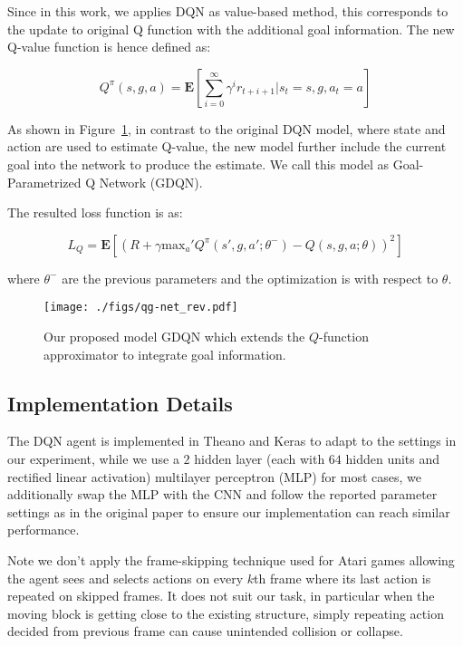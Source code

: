 \documentclass{article} %
\begin{document}
Since in this work, we applies DQN as value-based method, this corresponds to the update to original Q function with the additional goal information. The new Q-value function is hence defined as:

\begin{equation}
    Q^\pi(s,g,a) = \mathbf{E}[\sum\limits_{i=0}^\infty \gamma^i r_{t+i+1}|s_t=s,g,a_t=a]
\end{equation}

As shown in Figure~\ref{fig:goal_net}, in contrast to the original DQN model, where state and action are used to estimate Q-value,  the new model further include the current goal into the network to produce the estimate. We call this model as Goal-Parametrized Q Network (GDQN). 

The resulted loss function is as:

\begin{equation}
    L_Q = \mathbf{E}[(R + \gamma \text{max}_a' Q^\pi(s',g,a';\theta^-) - Q(s,g,a;\theta))^2 ]
\end{equation}

where $\theta^-$ are the previous parameters and the optimization is with respect to $\theta$. 

\begin{figure}[h]
\centering
\texttt{[image: ./figs/qg-net\_rev.pdf]}
\caption{Our proposed model GDQN which extends the $Q$-function approximator to integrate goal information.}
\label{fig:goal_net}
\end{figure}\subsection{Implementation Details}
The DQN agent is implemented in Theano and Keras to adapt to the settings in our experiment, while we use a $2$ hidden layer (each with $64$ hidden units and rectified linear activation) multilayer perceptron (MLP) for most cases, we additionally swap the MLP with the CNN and follow the reported parameter settings as in the original paper \citep{mnih2015human} to ensure our implementation can reach similar performance.

Note we don't apply the frame-skipping technique \citep{bellemare2012investigating} used for Atari games \citep{mnih2015human} allowing the agent sees and selects actions on every $k$th frame where its last action is repeated on skipped frames. It does not suit our task, in particular when the moving block is getting close to the existing structure, simply repeating action decided from previous frame can cause unintended collision or collapse. 
\end{document}

